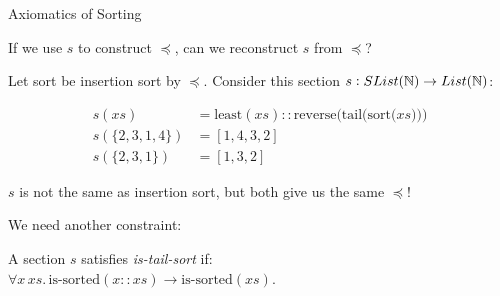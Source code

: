 \documentclass[9pt]{beamer}
\begin{document}
\begin{frame}{Axiomatics of Sorting}

If we use $s$ to construct $\preceq$, can we reconstruct $s$ from $\preceq$? 

Let sort be insertion sort by $\preceq$. Consider this section $s : SList(\mathbb{N}) \to List(\mathbb{N})$:

\begin{align*}
    s(xs) & = \text{least}(xs) :: \text{reverse(tail(sort($xs$)))} \\
    s(\{2,3,1,4\}) & = [1,4,3,2] \\
    s(\{2,3,1\}) & = [1, 3, 2]
\end{align*}

$s$ is not the same as insertion sort, but both give us the same $\preceq$!

We need another constraint: %

\begin{dblock}
    A section $s$ satisfies \textit{is-tail-sort} if: \\
    $\forall x \, xs. \, \text{is-sorted}(x :: xs) \to \text{is-sorted}(xs)$.
\end{dblock}
    
\end{frame}
\end{document}
